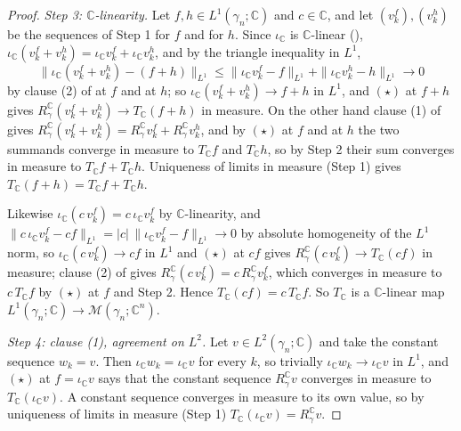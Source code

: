 \begin{proof}
\emph{Step 3: $\mathbb{C}$-linearity.}
Let $f, h \in L^1(\gamma_n;\mathbb{C})$ and $c \in \mathbb{C}$, and let
$(v^f_k), (v^h_k)$ be the sequences of Step 1 for $f$ and for $h$.  Since
$\iota_{\mathbb{C}}$ is $\mathbb{C}$-linear (),
$\iota_{\mathbb{C}}(v^f_k + v^h_k)
 = \iota_{\mathbb{C}} v^f_k + \iota_{\mathbb{C}} v^h_k$, and by the triangle
inequality in $L^1$,
\[
  \bigl\|\iota_{\mathbb{C}}(v^f_k + v^h_k) - (f+h)\bigr\|_{L^1}
    \leq \|\iota_{\mathbb{C}} v^f_k - f\|_{L^1}
      + \|\iota_{\mathbb{C}} v^h_k - h\|_{L^1} \longrightarrow 0
\]
by clause (2) of  at $f$ and at $h$; so
$\iota_{\mathbb{C}}(v^f_k + v^h_k) \to f + h$ in $L^1$, and
$(\star)$ at $f+h$ gives $R_\gamma^{\mathbb{C}}(v^f_k + v^h_k)
 \to T_{\mathbb{C}}(f+h)$ in measure.  On the other hand clause (1) of
 gives
$R_\gamma^{\mathbb{C}}(v^f_k + v^h_k)
 = R_\gamma^{\mathbb{C}} v^f_k + R_\gamma^{\mathbb{C}} v^h_k$, and by $(\star)$ at
$f$ and at $h$ the two summands converge in measure to $T_{\mathbb{C}}f$ and
$T_{\mathbb{C}}h$, so by Step 2 their sum converges in measure to
$T_{\mathbb{C}}f + T_{\mathbb{C}}h$.  Uniqueness of limits in measure (Step 1)
gives $T_{\mathbb{C}}(f+h) = T_{\mathbb{C}}f + T_{\mathbb{C}}h$.

Likewise $\iota_{\mathbb{C}}(c\,v^f_k) = c\,\iota_{\mathbb{C}} v^f_k$ by
$\mathbb{C}$-linearity, and
$\|c\,\iota_{\mathbb{C}} v^f_k - c f\|_{L^1}
 = |c|\,\|\iota_{\mathbb{C}} v^f_k - f\|_{L^1} \to 0$ by absolute homogeneity
of the $L^1$ norm, so $\iota_{\mathbb{C}}(c\,v^f_k) \to c f$ in $L^1$ and $(\star)$ at $cf$ gives $R_\gamma^{\mathbb{C}}(c\,v^f_k)
 \to T_{\mathbb{C}}(cf)$ in measure; clause (2) of
 gives
$R_\gamma^{\mathbb{C}}(c\,v^f_k) = c\,R_\gamma^{\mathbb{C}} v^f_k$, which
converges in measure to $c\,T_{\mathbb{C}}f$ by $(\star)$ at $f$ and Step 2.
Hence $T_{\mathbb{C}}(cf) = c\,T_{\mathbb{C}}f$.  So $T_{\mathbb{C}}$ is a
$\mathbb{C}$-linear map $L^1(\gamma_n;\mathbb{C}) \to
\mathcal{M}(\gamma_n;\mathbb{C}^n)$.

\emph{Step 4: clause (1), agreement on $L^2$.}
Let $v \in L^2(\gamma_n;\mathbb{C})$ and take the constant sequence
$w_k = v$.  Then $\iota_{\mathbb{C}} w_k = \iota_{\mathbb{C}} v$ for every $k$,
so trivially $\iota_{\mathbb{C}} w_k \to \iota_{\mathbb{C}} v$ in $L^1$, and
$(\star)$ at $f = \iota_{\mathbb{C}} v$ says that the constant sequence
$R_\gamma^{\mathbb{C}} v$ converges in measure to
$T_{\mathbb{C}}(\iota_{\mathbb{C}} v)$.  A constant sequence converges in measure
to its own value, so by uniqueness of limits in measure (Step 1)
$T_{\mathbb{C}}(\iota_{\mathbb{C}} v) = R_\gamma^{\mathbb{C}} v$.


\end{proof}
